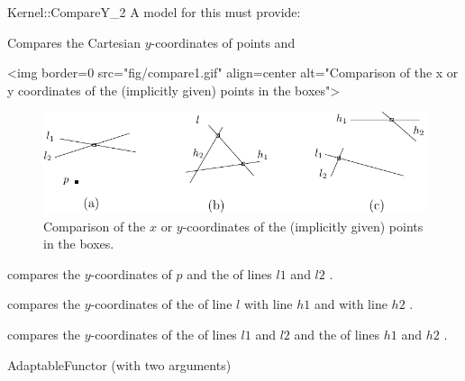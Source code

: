 \begin{ccRefFunctionObjectConcept}{Kernel::CompareY_2}
A model for this must provide:


      {Compares the Cartesian $y$-coordinates of points  and
      }

\begin{ccHtmlOnly}
<img border=0 src="fig/compare1.gif" align=center alt="Comparison of the x 
or y coordinates of the (implicitly given) points in the boxes">
\end{ccHtmlOnly} 

\begin{ccTexOnly}
\begin{figure}[h]
\centerline{\includegraphics{Kernel_23_ref/fig/compare1}}
\caption{Comparison of the $x$ or $y$-coordinates of the (implicitly
given) points in the boxes.\label{fig-compare14}}
\end{figure} 
\end{ccTexOnly} 


        {compares the $y$-coordinates of $p$ and the 
          of lines
         $l1$ and $l2$%
         .}


        {compares the $y$-coordinates of the  of line $l$
         with line $h1$ and with line $h2$%
         .}


        {compares the $y$-coordinates of the  of lines $l1$
         and $l2$ and  the  of lines $h1$ and $h2$ 
         .}


\ccRefines
AdaptableFunctor (with two arguments)

\ccSeeAlso
{} \\

\end{ccRefFunctionObjectConcept}
